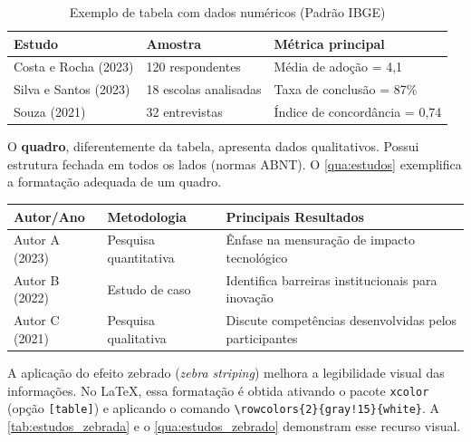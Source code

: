 \documentclass[
    12pt,        %
    openany,     %
    oneside,     %
    a4paper,     %
    english,     %
    french,      %
    spanish,     %
    brazil,      %
    article      %
]{abntex2}
\begin{document}
\begin{table}[htbp]
    \centering
    \caption{Exemplo de tabela com dados numéricos (Padrão IBGE)}
    \label{tab:estudos}
    \begin{tabularx}{0.8\textwidth}{p{4cm}XX}
        \toprule
        \textbf{Estudo} & \textbf{Amostra} & \textbf{Métrica principal} \\
        \midrule
        Costa e Rocha (2023) & 120 respondentes & Média de adoção = 4,1 \\
        Silva e Santos (2023) & 18 escolas analisadas & Taxa de conclusão = 87\% \\
        Souza (2021) & 32 entrevistas & Índice de concordância = 0,74 \\
        \bottomrule
    \end{tabularx}
\end{table}

O \textbf{quadro}, diferentemente da tabela, apresenta dados qualitativos. Possui estrutura fechada em todos os lados (normas ABNT). O \autoref{qua:estudos} exemplifica a formatação adequada de um quadro.

\begin{quadro}[htbp]
    \centering
    \caption{Exemplo de quadro com conteúdo qualitativo (Padrão ABNT)}
    \label{qua:estudos}
    \begin{tabularx}{\textwidth}{|p{3cm}|p{4cm}|X|}
        \hline
        \textbf{Autor/Ano} & \textbf{Metodologia} & \textbf{Principais Resultados} \\
        \hline
        Autor A (2023) & Pesquisa quantitativa & Ênfase na mensuração de impacto tecnológico \\ \hline
        Autor B (2022) & Estudo de caso & Identifica barreiras institucionais para inovação \\ \hline
        Autor C (2021) & Pesquisa qualitativa & Discute competências desenvolvidas pelos participantes \\ \hline
    \end{tabularx}
\end{quadro}

A aplicação do efeito zebrado (\textit{zebra striping}) melhora a legibilidade visual das informações. No LaTeX, essa formatação é obtida ativando o pacote \texttt{xcolor} (opção \texttt{[table]}) e aplicando o comando \verb|\rowcolors{2}{gray!15}{white}|. A \autoref{tab:estudos_zebrada} e o \autoref{qua:estudos_zebrado} demonstram esse recurso visual.
\end{document}
